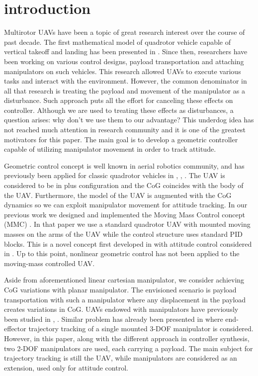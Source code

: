 \section{introduction}

Multirotor UAVs have been a topic of great research interest over the course of past decade. The first mathematical model of quadrotor vehicle capable of vertical takeoff and landing has been presented in \cite{hamel2002quad}. Since then, researchers have been working on various control designs, payload transportation and attaching manipulators on such vehicles. This research allowed UAVs to execute various tasks and interact with the environment. However, the common denominator in all that research is treating the payload and movement of the manipulator as a disturbance. Such approach puts all the effort for canceling these effects on controller. Although we are used to treating these effects as disturbances, a question arises: why don't we use them to our advantage? This underdog idea has not reached much attention in research community and it is one of the greatest motivators for this paper. The main goal is to develop a geometric controller capable of utilizing manipulator movement in order to track attitude. 

Geometric control concept is well known in aerial robotics community, and has previously been applied for classic quadrotor vehicles in \cite{LeeClanak4}, \cite{LeeClanak3}, \cite{LeeClanak1}. The UAV is considered to be in plus configuration and the CoG coincides with the body of the UAV. Furthermore, the model of the UAV is augmented with the CoG dynamics so we can exploit manipulator movement for attitude tracking. In our previous work we designed and implemented the Moving Mass Control concept (MMC) \cite{movingMass1}. In that paper we use a standard quadrotor UAV with mounted moving masses on the arms of the UAV while the control structure uses standard PID blocks. This is a novel concept first developed in \cite{movingMass2} with attitude control considered in \cite{movingMass3}. Up to this point, nonlinear geometric control has not been applied to the moving-mass controlled UAV.

Aside from aforementioned linear cartesian manipulator, we consider achieving CoG variations with planar manipulator. The envisioned scenario is payload transportation with such a manipulator where any displacement in the payload creates variations in CoG. UAVs endowed with manipulators have previously been studied in \cite{manipulator1}, \cite{manipulator2}. Similar problem has already been presented in \cite{manipulator3} where end-effector trajectory tracking of a single mounted 3-DOF manipulator is considered. However, in this paper, along with the different approach in controller synthesis, two 2-DOF manipulators are used, each carrying a payload. The main subject for trajectory tracking is still the UAV, while manipulators are considered as an extension, used only for attitude control.

